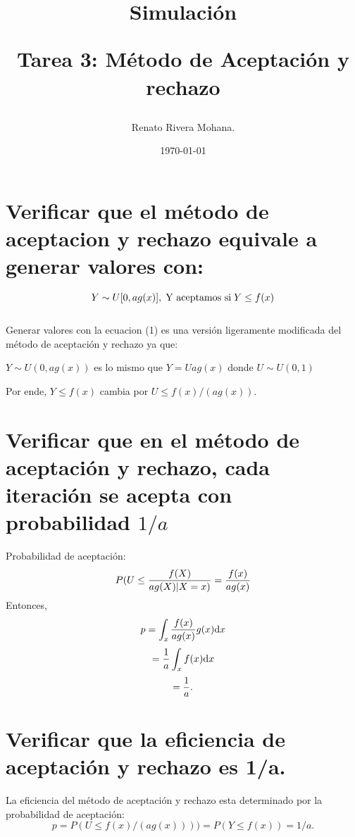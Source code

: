 \documentclass[letter, 10pt]{article}
\begin{document}
\title{Simulaci\'on \\ \begin{Large}Tarea 3: M\'etodo de Aceptaci\'on y rechazo\end{Large}}
\author{Renato Rivera Mohana.}
\date{\today}
\maketitle

\section{Verificar que el m\'etodo de aceptacion y rechazo equivale a generar valores con:}
\begin{equation}
\setcounter{equation}{1}
 Y \sim U[0, a g(x)], \;  \mbox{Y aceptamos si} \; Y \leq f(x) 
\end{equation}
\\
Generar valores con la ecuacion (1) es una versi\'on ligeramente modificada del m\'etodo de aceptaci\'on y rechazo ya que: 
\begin{center}
$ Y  \sim U(0, a g(x)) $ es lo mismo que $Y = U ag(x) $ donde $ U \sim U(0,1) $
\end{center}
\begin{center}
 Por ende,  $ Y \leq f(x)$ cambia por $ U \leq f(x)/(ag(x)) $.
\end{center}

  
\section{Verificar que en el m\'etodo de aceptaci\'on y rechazo, cada iteraci\'on se acepta con probabilidad $1/a$}
Probabilidad de aceptaci\'on:
\begin{equation}
P(U\leq {f(X)\over ag(X) | X=x)} = {f(x) \over ag(x)}
\end{equation}
Entonces,
\begin{equation}
p=\int_x {f(x)\over ag(x)} g(x)\mathrm{d}x
\end{equation}
$$ = {1\over a} \int_x f(x) \mathrm{d}x$$
$$= {1\over a}.$$

\section{Verificar que la eficiencia de aceptaci\'on y rechazo es 1/a.}
La eficiencia del m\'etodo de aceptaci\'on y rechazo  esta determinado por la probabilidad de aceptaci\'on:
\begin{equation}
p=P(U\leq f(x)/(ag(x))))=P(Y\leq f(x))=1/a.
\end{equation}
\end{document}
